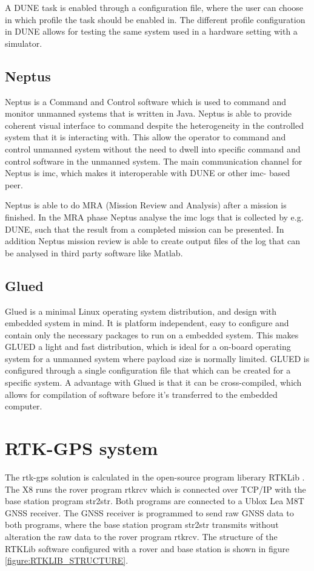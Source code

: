 A DUNE task is enabled through a configuration file, where the user can choose in which profile the task should be enabled in. The different profile configuration in DUNE allows for testing the same system used in a hardware setting with a simulator.
\subsection{Neptus}
Neptus is a Command and Control software which is used to command and monitor unmanned systems that is written in Java. Neptus is able to provide coherent visual interface to command despite the heterogeneity in the controlled system that it is interacting with.  This allow the operator to command and control unmanned system without the need to dwell into specific command and control software in the unmanned system. The main communication channel for Neptus is \gls{imc}, which makes it interoperable with DUNE or other \gls{imc}- based peer.

Neptus is able to do MRA (Mission Review and Analysis) after a mission is finished. In the MRA phase Neptus analyse the \gls{imc} logs that is collected by e.g. DUNE, such that the result from a completed mission can be presented. In addition Neptus mission review is able to create output files of the log that can be analysed in third party software like Matlab.
\subsection{Glued}
Glued is a minimal Linux operating system distribution, and design with embedded system in mind. It is platform independent, easy to configure and contain only the necessary packages to run on a embedded system. This makes GLUED a light and fast distribution, which is ideal for a on-board operating system for a unmanned system where payload size is normally limited. GLUED is configured through a single configuration file that which can be created for a specific system. A advantage with Glued is that it can be cross-compiled, which allows for compilation of software before it's transferred to the embedded computer.
\section{RTK-GPS system}
The \gls{rtk-gps} solution is calculated in the open-source program liberary RTKLib \citep{takasu2009development}.
The X8 runs the rover program rtkrcv which is connected over TCP/IP with the base station program str2str. Both programs are connected to a Ublox Lea M8T GNSS receiver. The GNSS receiver is programmed to send raw GNSS data to both programs, where the base station program str2str transmits without alteration the raw data to the rover program rtkrcv. The structure of the RTKLib software configured with a rover and base station is shown in figure \ref{figure:RTKLIB_STRUCTURE}.


